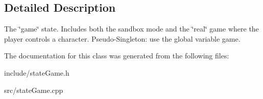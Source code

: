 \subsection{\-Detailed \-Description}
\-The \char`\"{}game\char`\"{} state. \-Includes both the sandbox mode and the \char`\"{}real\char`\"{} game where the player controls a character. \-Pseudo-\/\-Singleton\-: use the global variable game. 

\-The documentation for this class was generated from the following files\-:\begin{DoxyCompactItemize}
\item 
include/state\-Game.\-h\item 
src/state\-Game.\-cpp\end{DoxyCompactItemize}
